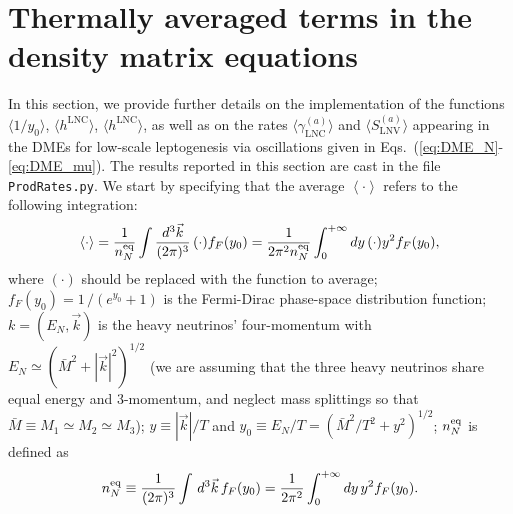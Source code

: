 \documentclass[12pt, a4paper]{article}
\def\Mav{\bar{M}}
\def\LNC{\text{LNC}}
\def\LNV{\text{LNV}}
\begin{document}
\section{Thermally averaged terms in the density matrix equations}\label{app:Rates}
In this section, we provide further details on the implementation of the functions $\langle 1/y_0\rangle$, $\langle h^{\LNC}\rangle$, $\langle h^{\LNC}\rangle$, as well as on the rates $\langle\gamma_{\LNC}^{(a)}\rangle$ and $\langle S_{\LNV}^{(a)}\rangle$ appearing in the DMEs for low-scale leptogenesis via oscillations given in Eqs.~(\ref{eq:DME_N}-\ref{eq:DME_mu}). The results reported in this section are cast in the file \texttt{ProdRates.py}. We start by specifying that the average $\left\langle \cdot \right\rangle$ refers to the following integration:
\begin{equation}\label{eq:therm_average}
 \left\langle \cdot \right \rangle = \frac{1}{n_N^{\rm eq}}\int \frac{d^3\vec{k}}{(2\pi)^3} \,(\cdot) f_F(y_0) = \frac{1}{ 2\pi^2 n_N^{\rm eq}}\int_0^{+\infty} dy\, (\cdot) y^2 f_F(y_0),
\end{equation}
where $(\cdot)$ should be replaced with the function to average; $ f_F(y_0) = 1\,/(e^{y_0}+1)$ is the Fermi-Dirac phase-space distribution function; $k = (E_N, \vec{k})$ is the heavy neutrinos' four-momentum with $E_N \simeq (\Mav^2 + |\vec{k}|^2)^{1/2}$ (we are assuming that the three heavy neutrinos share equal energy and 3-momentum, and neglect mass splittings so that $\Mav \equiv M_1 \simeq M_2 \simeq M_3$); $y \equiv |\vec{k}|/T$ and $y_0 \equiv E_N/T = (\Mav^2/T^2 + y^2)^{1/2}$; $n_N^{\rm eq}$ is defined as
\begin{equation}
n_N^{\rm eq} \equiv \frac{1}{(2\pi)^3}\int \, d^3\vec{k}\,f_F(y_0) = \frac{1}{2\pi^2}\int_0^{+\infty} dy\, y^2 f_F(y_0).
\end{equation}
\end{document}
